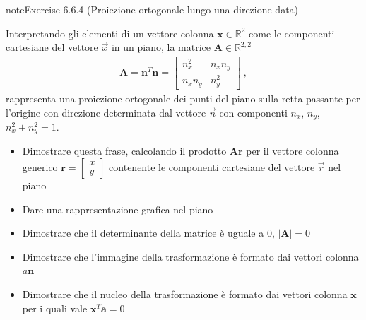 \documentclass[letterpaper,10pt,italian]{jupyterBook}
\begin{document}
\begin{sphinxadmonition}{note}{Exercise 6.6.4 (Proiezione ortogonale lungo una direzione data)}



\sphinxAtStartPar
Interpretando gli elementi di un vettore colonna \(\mathbf{x} \in \mathbb{R}^2\) come le componenti cartesiane del vettore \(\vec{x}\) in un piano, la matrice \(\mathbf{A} \in \mathbb{R}^{2,2}\)
\begin{equation*}
\begin{split}\mathbf{A} = \mathbf{n}^T \mathbf{n} = \begin{bmatrix} n_x^2 & n_x n_y \\  n_x n_y & n_y^2 \end{bmatrix} \ ,\end{split}
\end{equation*}
\sphinxAtStartPar
rappresenta una proiezione ortogonale dei punti del piano sulla retta passante per l’origine con direzione determinata dal vettore \(\vec{n}\) con componenti \(n_x\), \(n_y\), \(n_x^2 + n_y^2 = 1\).
\begin{itemize}
\item {} 
\sphinxAtStartPar
Dimostrare questa frase, calcolando il prodotto \(\mathbf{A} \mathbf{r}\) per il vettore colonna generico \(\mathbf{r} = \begin{bmatrix} x \\ y \end{bmatrix}\) contenente le componenti cartesiane del vettore \(\vec{r}\) nel piano

\item {} 
\sphinxAtStartPar
Dare una rappresentazione grafica nel piano

\item {} 
\sphinxAtStartPar
Dimostrare che il determinante della matrice è uguale a 0, \(|\mathbf{A}| = 0\)

\item {} 
\sphinxAtStartPar
Dimostrare che l’immagine della trasformazione è formato dai vettori colonna \(a \mathbf{n}\)

\item {} 
\sphinxAtStartPar
Dimostrare che il nucleo della trasformazione è formato dai vettori colonna \(\mathbf{x}\) per i quali vale \(\mathbf{x}^T \mathbf{a}=0\)

\end{itemize}
\end{sphinxadmonition}
 \label{exercise:matrix-projection-perpendicular}
\end{document}
